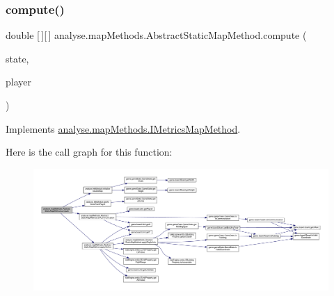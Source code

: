 \subsubsection{\texorpdfstring{compute()}{compute()}}
{\footnotesize\ttfamily double \mbox{[}$\,$\mbox{]}\mbox{[}$\,$\mbox{]} analyse.\+map\+Methods.\+Abstract\+Static\+Map\+Method.\+compute (\begin{DoxyParamCaption}\item[{\mbox{\hyperlink{classgame_1_1game_state_1_1_game_state}{Game\+State}}}]{state,  }\item[{\mbox{\hyperlink{enumgame_1_1_e_player}{E\+Player}}}]{player }\end{DoxyParamCaption})\hspace{0.3cm}{\ttfamily [inline]}}



Implements \mbox{\hyperlink{interfaceanalyse_1_1map_methods_1_1_i_metrics_map_method_aef15b826032a8cc1140563d539dd1319}{analyse.\+map\+Methods.\+I\+Metrics\+Map\+Method}}.

Here is the call graph for this function\+:
\nopagebreak
\begin{figure}[H]
\begin{center}
\leavevmode
\includegraphics[width=350pt]{classanalyse_1_1map_methods_1_1_abstract_static_map_method_a314b86189e095a68a77027e051f0ea9c_cgraph}
\end{center}
\end{figure}
\mbox{\label{classanalyse_1_1map_methods_1_1_abstract_static_map_method_a5f92c163d4402bbd591c2673d09fbbaf}} 
